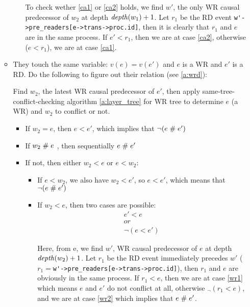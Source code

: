 \documentclass{llncs}
\begin{document}
\begin{enumerate}
\begin{itemize}
\begin{itemize}
			To check wether \eqref{ca1} or \eqref{ca2} holds, we find $w'$, the only WR causal predecessor of $w_2$ at depth $\mathop{\mathit{depth}} (w_1) + 1$.
			Let $r_1$ be the RD event 
			\verb!w'->pre_readers[e->trans->proc.id]!, then it is clearly that $r_1$ and $e$ are in the same process.
			If $ e' < r_1$, then we are at case \eqref{ca2}, otherwise ($e < r_1$), we are at case \eqref{ca1}.
		\end{itemize}
		\item 
		They touch the same variable: $v(e) = v(e')$ and $e$ is a WR and $e'$ is a RD. Do the following to figure out their relation (see \cref{a:wrd}):
		
		Find $w_2$, the latest WR causal predecessor of $e'$, then apply same-tree-conflict-checking algorithm \cref{a:layer_tree} for WR tree to determine $e$ (a WR) and $w_2$ to conflict or not.
		\begin{itemize}
			\item
			If $w_2 = e$, then $e < e'$, which implies that $\lnot (e \mathrel{\#} e')$
			\item
			If $w_2 \mathrel{\#} e$ , then sequentially $e \mathrel{\#} e'$
			\item
			If not, then either $ w_2< e$ or $e < w_2$:
			\begin{itemize}
				\item
				If $ e < w_2 $, we also have $w_2 < e'$, so $e < e'$, which means that $\lnot (e \mathrel{\#} e')$
				\item
				If $w_2 < e$, then two cases are possible:
				\begin{align}
					e' < e \label{wr1} \\
					or \nonumber \\
					\lnot (e < e') \label{wr2}
				\end{align}
				 
				Here, from e, we find $w'$, WR causal predecessor of $e$ at depth $\mathop{\mathit{depth}} (w_2) + 1$.
				Let $r_1$ be the RD event immediately precedes $w'$ ($r_1 = $\verb!w'->pre_readers[e->trans->proc.id]!), then $r_1$ and $e$ are obviously in the same process. 
				If $r_1 < e$, then we are at case \eqref{wr1} which means $e$ and $e'$ do not conflict at all, otherwise $_\lnot (r_1 < e) $, and we are at case \eqref{wr2} which implies that $e \mathrel{\#} e'$.
			\end{itemize}
		\end{itemize}
		

\end{itemize}
\end{enumerate}
\end{document}
